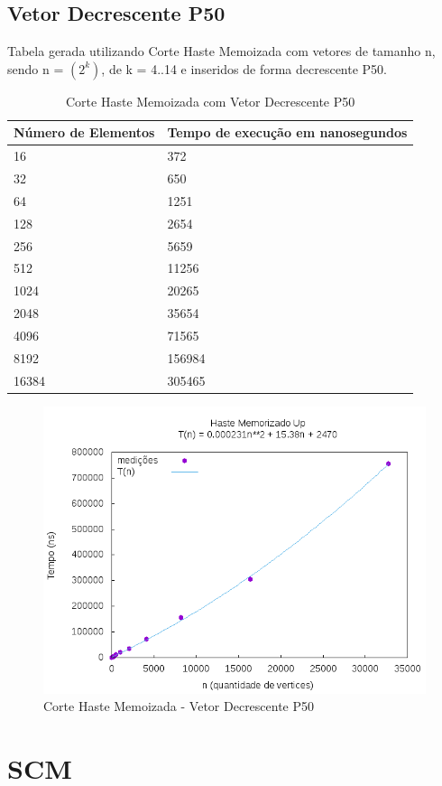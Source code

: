 \documentclass[12pt,a4paper,twoside]{report}
\begin{document}
\subsection{Vetor Decrescente P50}
Tabela gerada utilizando Corte Haste Memoizada com vetores de tamanho n, sendo n = $(2^k)$, de k = 4..14 e inseridos de forma decrescente P50.
\begin{table}[H]
\centering
\caption{Corte Haste Memoizada com Vetor Decrescente P50}
\label{my-label}
\begin{tabular}{|l|l|}
\hline
\multicolumn{1}{|c|}{\textbf{Número de Elementos}} & \multicolumn{1}{c|}{\textbf{Tempo de execução em nanosegundos}} \\ \hline
16 & 372 \\ \hline
32 & 650 \\ \hline
64 & 1251 \\ \hline
128 & 2654 \\ \hline
256 & 5659 \\ \hline
512 & 11256 \\ \hline
1024 & 20265 \\ \hline
2048 & 35654 \\ \hline
4096 & 71565 \\ \hline
8192 & 156984 \\ \hline
16384 & 305465 \\ \hline
\end{tabular}
\end{table}

\begin{figure}[H]
    \centering
    \includegraphics[width=0.7\linewidth]{graficos/CorteHasteMemorizado/DecrescenteP50/HasteMemo.png}
  \caption{Corte Haste Memoizada - Vetor Decrescente P50}
\end{figure}

\section{SCM}
\end{document}
